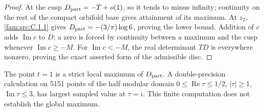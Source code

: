 \begin{proof}
At the cusp \(D_{\rm part}=-T+o(1)\), so it tends to minus infinity;
continuity on the rest of the compact orbifold base gives attainment of
its maximum. At \(z_2\), \ref{fam:src:C.1.1} gives
\(D_{\rm part}=-(3/\pi)\log6\), proving the lower bound. Addition of \(c\)
adds \(\operatorname{Im}c\) to \(D\); a zero is forced by continuity
between a maximum and the cusp whenever \(\operatorname{Im}c\geq-M\).
For \(\operatorname{Im}c<-M\), the real determinant \(TD\) is everywhere
nonzero, proving the exact asserted form of the admissible disc.
\end{proof}

\begin{proposition}\label{fam:src:C.2.2}\label{fam:st:C.2.2}
The point \(t=1\) is a strict local maximum of \(D_{\rm part}\).
A double-precision calculation on 5151 points of the half modular domain
\(0\leq\operatorname{Re}\tau\leq1/2\), \(|\tau|\geq1\),
\(\operatorname{Im}\tau\leq3\), has largest sampled value at \(\tau=i\).
This finite computation does not establish the global maximum.
\end{proposition}

